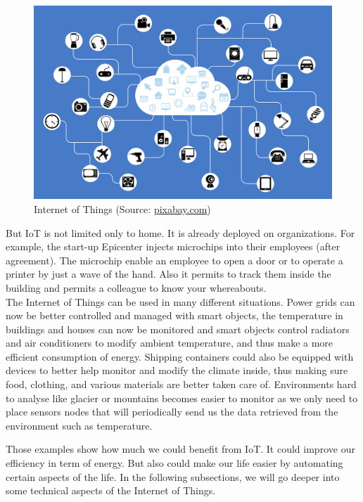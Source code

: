 \begin{figure}
  \label{fig:iot}
  \centering
  \includegraphics[scale=0.3]{res/iot.png}
  \caption{Internet of Things (Source: \url{pixabay.com})}
\end{figure}

But IoT is not limited only to home. It is already deployed on organizations. For example, the start-up Epicenter injects microchips into their employees (after agreement)\cite{website:lat_04_17}. The microchip enable an employee to open a door or to operate a printer by just a wave of the hand. Also it permits to track them inside the building and permits a colleague to know your whereabouts. \\

The Internet of Things can be used in many different situations. Power grids can now be better controlled and managed with smart objects, the temperature in buildings and houses can now be monitored and smart objects control radiators and air conditioners to modify ambient temperature, and thus make a more efficient consumption of energy. Shipping containers could also be equipped with devices to better help monitor and modify the climate inside, thus making sure food, clothing, and various materials are better taken care of. Environments hard to analyse like glacier or mountains becomes easier to monitor as we only need to place sensors nodes that will periodically send us the data retrieved from the environment such as temperature. \\


Those examples show how much we could benefit from IoT. It could improve our efficiency in term of energy. But also could make our life easier by automating certain aspects of the life. In the following subsections, we will go deeper into some technical aspects of the Internet of Things. \\

